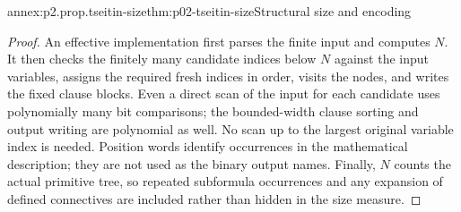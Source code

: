 \begin{annexitem}{annex:p2.prop.tseitin-size}{thm:p02-tseitin-size}{Structural size and encoding}
\begin{proof}
An effective implementation first parses the finite input and computes
\(N\).  It then checks the finitely many candidate indices below \(N\)
against the input variables, assigns the required fresh indices in order,
visits the nodes, and writes the fixed clause blocks.  Even a direct scan of
the input for each candidate uses polynomially many bit comparisons; the
bounded-width clause sorting and output writing are polynomial as well.
No scan up to the largest original variable index is needed.  Position words
identify occurrences in the mathematical description; they are not used as
the binary output names.  Finally, \(N\) counts the actual primitive tree,
so repeated subformula occurrences and any expansion of defined connectives
are included rather than hidden in the size measure.
\end{proof}
\end{annexitem}
